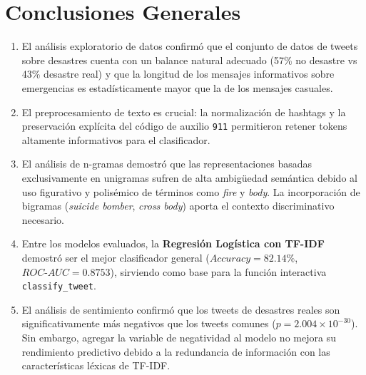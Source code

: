 \documentclass[11pt,a4paper]{article}
\begin{document}
\section{Conclusiones Generales}
\begin{enumerate}
    \item El análisis exploratorio de datos confirmó que el conjunto de datos de tweets sobre desastres cuenta con un balance natural adecuado (57\% no desastre vs 43\% desastre real) y que la longitud de los mensajes informativos sobre emergencias es estadísticamente mayor que la de los mensajes casuales.
    \item El preprocesamiento de texto es crucial: la normalización de hashtags y la preservación explícita del código de auxilio \texttt{911} permitieron retener tokens altamente informativos para el clasificador.
    \item El análisis de n-gramas demostró que las representaciones basadas exclusivamente en unigramas sufren de alta ambigüedad semántica debido al uso figurativo y polisémico de términos como \textit{fire} y \textit{body}. La incorporación de bigramas (\textit{suicide bomber}, \textit{cross body}) aporta el contexto discriminativo necesario.
    \item Entre los modelos evaluados, la \textbf{Regresión Logística con TF-IDF} demostró ser el mejor clasificador general ($Accuracy = 82.14\%$, $ROC\text{-}AUC = 0.8753$), sirviendo como base para la función interactiva \texttt{classify\_tweet}.
    \item El análisis de sentimiento confirmó que los tweets de desastres reales son significativamente más negativos que los tweets comunes ($p = 2.004 \times 10^{-30}$). Sin embargo, agregar la variable de negatividad al modelo no mejora su rendimiento predictivo debido a la redundancia de información con las características léxicas de TF-IDF.
\end{enumerate}
\end{document}
